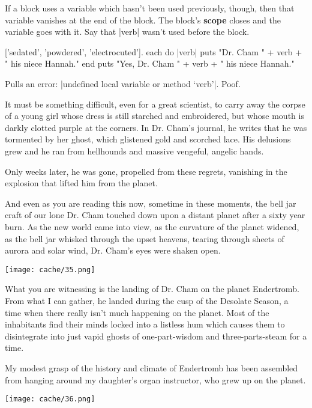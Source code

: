 \documentclass[12pt,twoside]{report}
\begin{document}
If a block uses a variable which hasn't been used previously, though,
then that variable vanishes at the end of the block.  The block's {\bf
  scope} closes and the variable goes with it.  Say that
\rubyinline|verb| wasn't used before the block.


\begin{rubycode}

 ['sedated', 'powdered', 'electrocuted'].
 each do |verb|
   puts "Dr. Cham " + verb + " his niece Hannah."
 end
 puts "Yes, Dr. Cham " + verb + " his niece Hannah."

\end{rubycode}


Pulls an error: 
\rubyinline|undefined local variable or method `verb'|.  
Poof.

It must be something difficult, even for a great scientist, to carry
away the corpse of a young girl whose dress is still starched and
embroidered, but whose mouth is darkly clotted purple at the corners.
In Dr. Cham's journal, he writes that he was tormented by her ghost,
which glistened gold and scorched lace.  His delusions grew and he ran
from hellhounds and massive vengeful, angelic hands.

Only weeks later, he was gone, propelled from these regrets, vanishing
in the explosion that lifted him from the planet.

And even as you are reading this now, sometime in these moments, the
bell jar craft of our lone Dr. Cham touched down upon a distant planet
after a sixty year burn.  As the new world came into view, as the
curvature of the planet widened, as the bell jar whisked through the
upset heavens, tearing through sheets of aurora and solar wind,
Dr. Cham's eyes were shaken open.

	\texttt{[image: cache/35.png]}

What you are witnessing is the landing of Dr. Cham on the planet
Endertromb.  From what I can gather, he landed during the cusp of the
Desolate Season, a time when there really isn't much happening on the
planet.  Most of the inhabitants find their minds locked into a
listless hum which causes them to disintegrate into just vapid ghosts
of one-part-wisdom and three-parts-steam for a time.

My modest grasp of the history and climate of Endertromb has been
assembled from hanging around my daughter's organ instructor, who grew
up on the planet.

	\texttt{[image: cache/36.png]}
\end{document}
